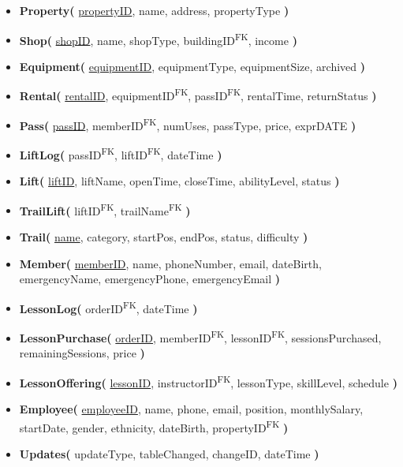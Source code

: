 \documentclass[11pt]{scrartcl}
\begin{document}
\begin{itemize}
  \item \textbf{Property(} \underline{propertyID}, name, address, propertyType \textbf{)}

  \item \textbf{Shop(} \underline{shopID}, name, shopType, buildingID\textsuperscript{FK}, income \textbf{)}

  \item \textbf{Equipment(} \underline{equipmentID}, equipmentType, equipmentSize, archived \textbf{)}

  \item \textbf{Rental(} \underline{rentalID}, equipmentID\textsuperscript{FK}, passID\textsuperscript{FK}, rentalTime, returnStatus \textbf{)}

  \item \textbf{Pass(} \underline{passID}, memberID\textsuperscript{FK}, numUses, passType, price, exprDATE \textbf{)}

  \item \textbf{LiftLog(} passID\textsuperscript{FK}, liftID\textsuperscript{FK}, dateTime \textbf{)}

  \item \textbf{Lift(} \underline{liftID}, liftName, openTime, closeTime, abilityLevel, status \textbf{)}

  \item \textbf{TrailLift(} liftID\textsuperscript{FK}, trailName\textsuperscript{FK} \textbf{)}

  \item \textbf{Trail(} \underline{name}, category, startPos, endPos, status, difficulty \textbf{)}

  \item \textbf{Member(} \underline{memberID}, name, phoneNumber, email, dateBirth, emergencyName, emergencyPhone, emergencyEmail \textbf{)}

  \item \textbf{LessonLog(} orderID\textsuperscript{FK}, dateTime \textbf{)}

  \item \textbf{LessonPurchase(} \underline{orderID}, memberID\textsuperscript{FK}, lessonID\textsuperscript{FK}, sessionsPurchased, remainingSessions, price \textbf{)}

  \item \textbf{LessonOffering(} \underline{lessonID}, instructorID\textsuperscript{FK}, lessonType, skillLevel, schedule \textbf{)}

  \item \textbf{Employee(} \underline{employeeID}, name, phone, email, position, monthlySalary, startDate, gender, ethnicity, dateBirth, propertyID\textsuperscript{FK} \textbf{)}

  \item \textbf{Updates(} updateType, tableChanged, changeID, dateTime \textbf{)}
\end{itemize}
\end{document}
